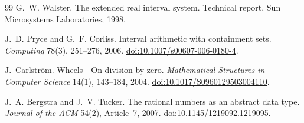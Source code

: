 \documentclass[11pt,a4paper]{article}
\theoremstyle{paperdef}
\begin{document}
\begin{thebibliography}{99}
G.~W. Walster.
\newblock The extended real interval system.
\newblock Technical report, Sun Microsystems Laboratories, 1998.

J.~D. Pryce and G.~F. Corliss.
\newblock Interval arithmetic with containment sets.
\newblock \emph{Computing} 78(3), 251--276, 2006.
\newblock \href{https://doi.org/10.1007/s00607-006-0180-4}{doi:10.1007/s00607-006-0180-4}.

J.~Carlstr\"om.
\newblock Wheels---On division by zero.
\newblock \emph{Mathematical Structures in Computer Science} 14(1),
143--184, 2004.
\newblock \href{https://doi.org/10.1017/S0960129503004110}{doi:10.1017/S0960129503004110}.

J.~A. Bergstra and J.~V. Tucker.
\newblock The rational numbers as an abstract data type.
\newblock \emph{Journal of the ACM} 54(2), Article~7, 2007.
\newblock \href{https://doi.org/10.1145/1219092.1219095}{doi:10.1145/1219092.1219095}.

\end{thebibliography}
\end{document}
